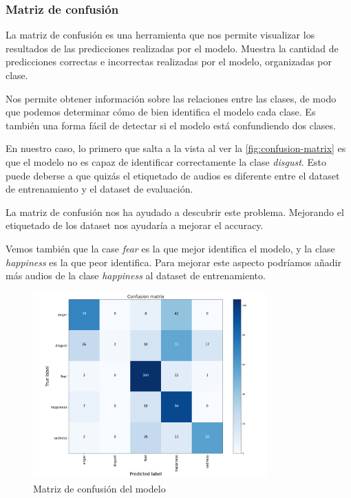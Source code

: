 \subsubsection{Matriz de confusión}\label{seccion:matriz-de-confusion}
La matriz de confusión es una herramienta que nos permite visualizar los resultados de las predicciones realizadas por el modelo.
Muestra la cantidad de predicciones correctas e incorrectas realizadas por el modelo, organizadas por clase.

Nos permite obtener información sobre las relaciones entre las clases, de modo que podemos determinar cómo de bien identifica el modelo cada clase.
Es también una forma fácil de detectar si el modelo está confundiendo dos clases.

En nuestro caso, lo primero que salta a la vista al ver la \autoref{fig:confusion-matrix} es que el modelo no es capaz de identificar correctamente la clase \textit{disgust}.
Esto puede deberse a que quizás el etiquetado de audios es diferente entre el dataset de entrenamiento y el dataset de evaluación.

La matriz de confusión nos ha ayudado a descubrir este problema.
Mejorando el etiquetado de los dataset nos ayudaría a mejorar el accuracy.

Vemos también que la case \textit{fear} es la que mejor identifica el modelo, y la clase \textit{happiness} es la que peor identifica. 
Para mejorar este aspecto podríamos añadir más audios de la clase \textit{happiness} al dataset de entrenamiento. 



\begin{figure}
    \centering
    \includegraphics[width=0.8\textwidth]{cap2/images/confusion_matrix.png}
    \caption{Matriz de confusión del modelo}
    \label{fig:confusion-matrix}
\end{figure}


